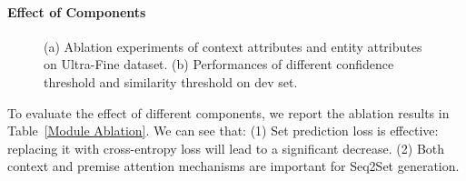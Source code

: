 \documentclass[11pt]{article}
\begin{document}
\paragraph{Effect of Components}
\begin{table}[htb!]
\centering
{}
\caption{Ablation results on Ultra-Fine dataset: PreAtt denotes premise attention, ConAtt denotes contextual attention, and -SetLoss denotes replacing set prediction loss with cross-entropy loss.}
\label{Module Ablation}
\end{table}
\begin{figure}[htb!]
\setlength{\belowcaptionskip}{-0cm}
\centering
	\caption{(a) Ablation experiments of context attributes and entity attributes on Ultra-Fine dataset. (b) Performances of different confidence threshold  and similarity threshold  on dev set.} 
\end{figure}
To evaluate the effect of different components, we report the ablation results in Table~\ref{Module Ablation}. We can see that: (1) Set prediction loss is effective: replacing it with cross-entropy loss will lead to a significant decrease. (2) Both context and premise attention mechanisms are important for Seq2Set generation.
\end{document}
